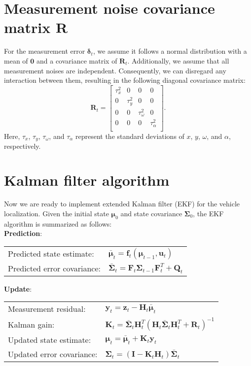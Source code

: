 \documentclass[12pt, a4paper]{article}
\begin{document}
\section{Measurement noise covariance matrix $\bm{R}$}
For the measurement error $\bm{\delta}_{t}$, we assume it follows a normal distribution with a mean of $\bm{0}$ and a covariance matrix of $\bm{R}_{t}$. Additionally, we assume that all measurement noises are independent. Consequently, we can disregard any interaction between them, resulting in the following diagonal covariance matrix:
\[
  \bm{R}_{t} = \begin{bmatrix}
    \tau_{x}^2 & 0 & 0 & 0\\
    0 & \tau_{y}^2 & 0 & 0\\
    0 & 0 & \tau_{\omega}^2 & 0\\
    0 & 0 & 0 & \tau_{\alpha}^2\\
  \end{bmatrix}.
\]
Here, $\tau_{x}$, $\tau_{y}$, $\tau_{\omega}$, and $\tau_{\alpha}$ represent the standard deviations of $x$, $y$, $\omega$, and $\alpha$, respectively.

\section{Kalman filter algorithm}
Now we are ready to implement extended Kalman filter (EKF) for the vehicle localization. Given the initial state $\bm{\mu}_{0}$ and state covariance $\bm{\Sigma}_{0}$, the EKF algorithm is summarized as follows:\\

\textbf{Prediction}:
\begin{center}
\begin{tabular}{ll}
  Predicted state estimate: & $\bar{\bm{\mu}}_{t} = \bm{f}_{t}(\bm{\mu}_{t-1}, \bm{u}_{t})$\\
  Predicted error covariance: & $\bar{\bm{\Sigma}}_{t} = \bm{F}_{t}\bm{\Sigma}_{t-1}\bm{F}_{t}^{T}+\bm{Q}_{t}$
\end{tabular}
\end{center}

\textbf{Update}:
\begin{center}
\begin{tabular}{ll}
  Measurement residual: & $\bm{y}_{t} = \bm{z}_{t}-\bm{H}_{t}\bar{\bm{\mu}}_{t}$\\
  Kalman gain: & $\bm{K}_{t} = \bar{\bm{\Sigma}}_{t}\bm{H}_{t}^{T}(\bm{H}_{t}\bar{\bm{\Sigma}}_{t}\bm{H}_{t}^{T}+\bm{R}_{t})^{-1}$\\
  Updated state estimate: & $\bm{\mu}_{t} = \bar{\bm{\mu}}_{t} + \bm{K}_{t}\bm{y}_{t}$\\
  Updated error covariance: & $\bm{\Sigma}_{t} = (\bm{I}-\bm{K}_{t}\bm{H}_{t})\bar{\bm{\Sigma}}_{t}$
\end{tabular}
\end{center}
\end{document}
